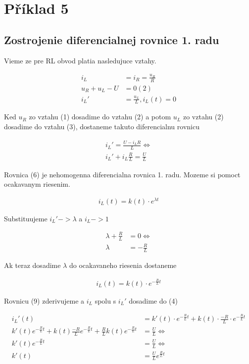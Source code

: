 \section{Příklad 5}

\subsection{Zostrojenie diferencialnej rovnice 1. radu}

Vieme ze pre RL obvod platia nasledujuce vztahy.

\begin{align}
    i_L &= i_R = \frac{u_R}{R} \\
    u_R + u_L - U &= 0 (2)\\
    i_L' &= \frac{u_L}{L}, i_L(t) = 0
\end{align}

Ked $u_R$ zo vztahu (1) dosadime do vztahu (2) a potom $u_L$ zo vztahu (2) dosadime do vztahu (3), 
dostaneme takuto diferencialnu rovnicu

\begin{align}
    i_L' = \frac{U - i_L R}{L}  \iff\\
    i_L' + i_L \frac{R}{L} = \frac{U}{L}
\end{align}

Rovnica (6) je nehomogenna diferencialna rovnica 1. radu. Mozeme si pomoct ocakavanym riesenim.

\begin{align}
    i_L(t) = k(t) \cdot e^{\lambda t}
\end{align}

Substituujeme $i_L' -> \lambda$ a $i_L -> 1$

\begin{align}
    \lambda  + \frac{R}{L} &= 0 \iff\\
    \lambda &= -\frac{R}{L}
\end{align}

Ak teraz dosadime $\lambda$ do ocakavaneho riesenia dostaneme 

\begin{align}
    i_L(t) = k(t) \cdot e^{-\frac{R}{L}t}
\end{align}

Rovnicu (9) zderivujeme a $i_L$ spolu s $i_L'$ dosadime do (4)

\begin{align}
    i_L'(t) &= k'(t) \cdot e^{-\frac{R}{L}t} + k(t) \cdot \frac{-R}{L} \cdot e^{-\frac{R}{L}t}\\
    k'(t) e^{-\frac{R}{L}t} + k(t) \frac{-R}{L} e^{-\frac{R}{L}t} + \frac{R}{L} k(t) e^{-\frac{R}{L}t} &= \frac{U}{L} \iff\\
    k'(t) e^{-\frac{R}{L}t} &= \frac{U}{L} \iff\\
    k'(t) &= \frac{U}{L} e^{\frac{R}{L}t}
\end{align}

